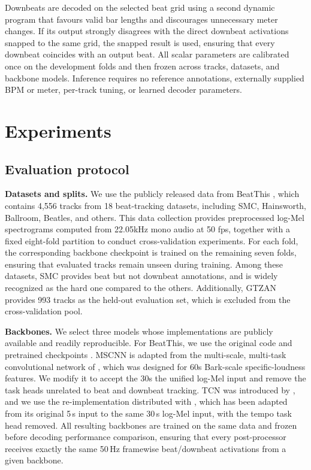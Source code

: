 \documentclass{article}
\newif\ifshowchanges
\newcommand{\rev}[1]{%
  \ifshowchanges
    \textcolor{red}{#1}%
  \else
    #1%
  \fi
}
\begin{document}
\rev{Downbeats are decoded on the selected beat grid using a second
dynamic program that favours valid bar lengths and discourages
unnecessary meter changes. If its output strongly disagrees with the
direct downbeat activations snapped to the same grid, the snapped result
is used, ensuring that every downbeat coincides with an output beat.
All scalar parameters are calibrated once on the development folds and
then frozen across tracks, datasets, and backbone models. Inference
requires no reference annotations, externally supplied BPM or meter,
per-track tuning, or learned decoder parameters.}

\section{Experiments}
\label{sec:exp}
\subsection{Evaluation protocol}
\textbf{Datasets and splits.} We use the publicly released data from BeatThis \cite{foscarin2024beat}, which contains 4,556 tracks from 18 beat-tracking datasets, including SMC, Hainsworth, Ballroom, Beatles, and others. This data collection provides preprocessed log-Mel spectrograms computed from 22.05kHz mono audio at 50 fps, together with a fixed eight-fold partition to conduct cross-validation experiments. For each fold, the corresponding backbone checkpoint is trained on the remaining seven folds, ensuring that evaluated tracks remain unseen during training. Among these datasets, SMC provides beat but not downbeat annotations, and is widely recognized as the hard one compared to the others. Additionally, GTZAN provides 993 tracks as the held-out evaluation set, which is excluded from the cross-validation pool.

\textbf{Backbones.} We select three models whose implementations are publicly available and readily reproducible. For BeatThis, we use the original code and pretrained checkpoints \cite{foscarin2024beat}. MSCNN is adapted from the multi-scale, multi-task convolutional network of \cite{he2026dynest}, which was designed for 60s Bark-scale specific-loudness features. We modify it to accept the 30s the unified log-Mel input and remove the task heads unrelated to beat and downbeat tracking. TCN was introduced by \cite{bock2020deconstruct}, and we use the re-implementation distributed with \cite{he2026dynest}, which has been adapted from its original 5\,s input to the same 30\,s log-Mel input, with the tempo task head removed. All resulting backbones are trained on the same data and frozen before decoding performance comparison, ensuring that every post-processor receives exactly the same 50\,Hz framewise beat/downbeat activations from a given backbone.
\end{document}
